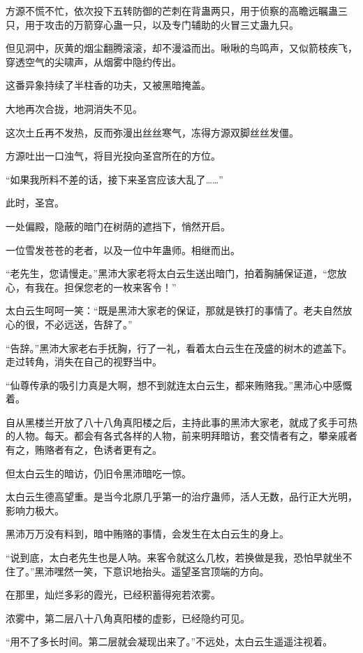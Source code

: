 \begin{this_body}
方源不慌不忙，依次投下五转防御的芒刺在背蛊两只，用于侦察的高瞻远瞩蛊三只，用于攻击的万箭穿心蛊一只，以及专门辅助的火冒三丈蛊九只。

但见洞中，灰黄的烟尘翻腾滚滚，却不漫溢而出。啾啾的鸟鸣声，又似箭枝疾飞，穿透空气的尖啸声，从烟雾中隐约传出。

这番异象持续了半柱香的功夫，又被黑暗掩盖。

大地再次合拢，地洞消失不见。

这次土丘再不发热，反而弥漫出丝丝寒气，冻得方源双脚丝丝发僵。

方源吐出一口浊气，将目光投向圣宫所在的方位。

“如果我所料不差的话，接下来圣宫应该大乱了……”

此时，圣宫。

一处偏殿，隐蔽的暗门在树荫的遮挡下，悄然开启。

一位雪发苍苍的老者，以及一位中年蛊师。相继而出。

“老先生，您请慢走。”黑沛大家老将太白云生送出暗门，拍着胸脯保证道，“您放心，有我在。担保您老的一枚来客令！”

太白云生呵呵一笑：“既是黑沛大家老的保证，那就是铁打的事情了。老夫自然放心的很，不必远送，告辞了。”

“告辞。”黑沛大家老右手抚胸，行了一礼，看着太白云生在茂盛的树木的遮盖下。走过转角，消失在自己的视野当中。

“仙尊传承的吸引力真是大啊，想不到就连太白云生，都来贿赂我。”黑沛心中感慨着。

自从黑楼兰开放了八十八角真阳楼之后，主持此事的黑沛大家老，就成了炙手可热的人物。每天。都会有各式各样的人物，前来明拜暗访，套交情者有之，攀亲戚者有之，贿赂者有之，色诱者更有之。

但太白云生的暗访，仍旧令黑沛暗吃一惊。

太白云生德高望重。是当今北原几乎第一的治疗蛊师，活人无数，品行正大光明，影响力极大。

黑沛万万没有料到，暗中贿赂的事情，会发生在太白云生的身上。

“说到底，太白老先生也是人呐。来客令就这么几枚，若换做是我，恐怕早就坐不住了。”黑沛嘿然一笑，下意识地抬头。遥望圣宫顶端的方向。

在那里，灿烂多彩的霞光，已经积蓄得宛若浓雾。

浓雾中，第二层八十八角真阳楼的虚影，已经隐约可见。

“用不了多长时间。第二层就会凝现出来了。”不远处，太白云生遥遥注视着。


\end{this_body}
